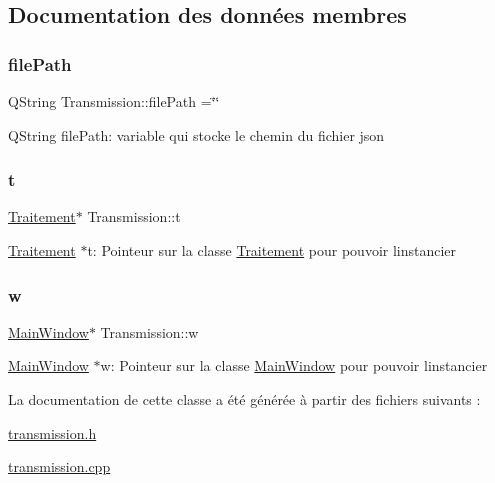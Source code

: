 \subsection{Documentation des données membres}
\mbox{\label{classTransmission_a3514cc6116b900b586f8cbf194cb39e7}} 
\subsubsection{\texorpdfstring{file\+Path}{filePath}}
{\footnotesize\ttfamily Q\+String Transmission\+::file\+Path =\char`\"{}\char`\"{}\hspace{0.3cm}{\ttfamily [private]}}

Q\+String file\+Path\+: variable qui stocke le chemin du fichier json \mbox{\label{classTransmission_ad05ceda47dcb0763e32e03e089defdb0}} 
\subsubsection{\texorpdfstring{t}{t}}
{\footnotesize\ttfamily \hyperlink{classTraitement}{Traitement}$\ast$ Transmission\+::t\hspace{0.3cm}{\ttfamily [private]}}

\hyperlink{classTraitement}{Traitement} $\ast$t\+: Pointeur sur la classe \hyperlink{classTraitement}{Traitement} pour pouvoir l\textquotesingle{}instancier \mbox{\label{classTransmission_a46ff40b83d046581408dce2027139fe0}} 
\subsubsection{\texorpdfstring{w}{w}}
{\footnotesize\ttfamily \hyperlink{classMainWindow}{Main\+Window}$\ast$ Transmission\+::w\hspace{0.3cm}{\ttfamily [private]}}

\hyperlink{classMainWindow}{Main\+Window} $\ast$w\+: Pointeur sur la classe \hyperlink{classMainWindow}{Main\+Window} pour pouvoir l\textquotesingle{}instancier 

La documentation de cette classe a été générée à partir des fichiers suivants \+:\begin{DoxyCompactItemize}
\item 
\hyperlink{transmission_8h}{transmission.\+h}\item 
\hyperlink{transmission_8cpp}{transmission.\+cpp}\end{DoxyCompactItemize}
